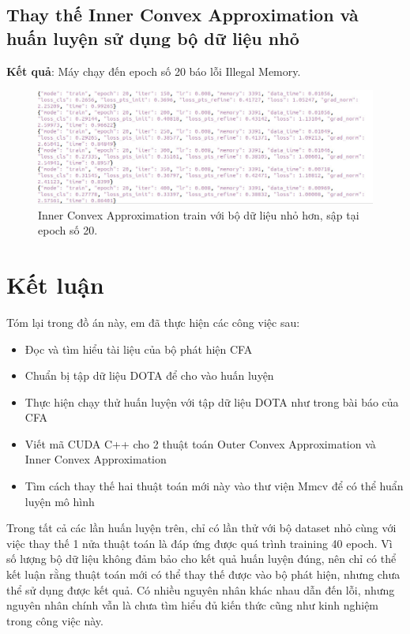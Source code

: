 \documentclass[12pt,a4paper,openany,oneside]{report}
\begin{document}
\section{Thay thế Inner Convex Approximation và huấn luyện sử dụng bộ dữ liệu nhỏ}

\textbf{Kết quả}: Máy chạy đến epoch số 20 báo lỗi Illegal Memory.

\begin{figure}[ht!]
	\begin{center}
		\includegraphics[width=450px]{./inner_smalldata_epoch20.JPG}
		\caption{Inner Convex Approximation train với bộ dữ liệu nhỏ hơn, sập tại epoch số 20.}
		\label{inner_smalldata_epoch20}
	\end{center}
\end{figure} 

\chapter*{{Kết luận}}
Tóm lại trong đồ án này, em đã thực hiện các công việc sau:
\begin{itemize}
	\item Đọc và tìm hiểu tài liệu của bộ phát hiện CFA
	\item Chuẩn bị tập dữ liệu DOTA để cho vào huấn luyện
	\item Thực hiện chạy thử huấn luyện với tập dữ liệu DOTA như trong bài báo của CFA
	\item Viết mã CUDA C++ cho 2 thuật toán Outer Convex Approximation và Inner Convex Approximation
	\item Tìm cách thay thế hai thuật toán mới này vào thư viện Mmcv để có thể huẩn luyện mô hình
\end{itemize}

Trong tất cả các lần huấn luyện trên, chỉ có lần thử với bộ dataset nhỏ cùng với việc thay thế 1 nửa thuật toán là đáp ứng được quá trình training 40 epoch. Vì số lượng bộ dữ liệu không đảm bảo cho kết quả huấn luyện đúng, nên chỉ có thể kết luận rằng thuật toán mới có thể thay thế được vào bộ phát hiện, nhưng chưa thể sử dụng được kết quả. Có nhiều nguyên nhân khác nhau dẫn đến lỗi, nhưng nguyên nhân chính vẫn là chưa tìm hiểu đủ kiến thức cũng như kinh nghiệm trong công việc này.
\end{document}
